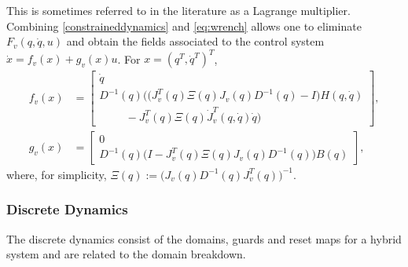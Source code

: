 This is sometimes referred to in the literature as a Lagrange multiplier.\cite{MLS94}\xspace Combining \eqref{constraineddynamics} and \eqref{eq:wrench} allows one to eliminate $F_{v}(q, {\dot q}, u)$ and obtain the fields associated to the control system $\dot{x} = f_{v}(x) + g_{v}(x) u$. For $x = (q^{T}, {\dot q}^{T})^{T}$,
\begin{align}
  f_{v}(x) \!\! &= \!\!\! \left[\!\!\!\begin{array}{c}
      \dot{q}\\
      D^{-1}(q)\Big( \big(J_{v}^{T}(q) \Xi(q) J_{v}(q) D^{-1}(q) - I \big) H(q, {\dot q}) \\
      \hspace{1cm}- J_{v}^{T}(q) \Xi(q) {\dot J}_{v}^{T}(q, {\dot q}) {\dot q} \Big)
    \end{array}\!\!\!\right],\\
  \label{eqn:controlsystem}
  g_{v}(x) \!\! &= \!\!\! \left[\!\!\!\begin{array}{c}
      0\\
      D^{-1}(q) \big(I - J_{v}^{T}(q) \Xi(q) J_{v}(q) D^{-1}(q) \big) B(q)
    \end{array}\!\!\!\right],
\end{align}
where, for simplicity, $\Xi(q) := \big( J_{v}(q) D^{-1}(q) J_{v}^{T}(q) \big)^{-1}$.

\subsubsection{Discrete Dynamics}
The discrete dynamics consist of the domains, guards and reset maps for a hybrid system and are related to the domain breakdown.


